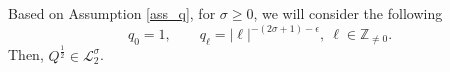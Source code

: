 \documentclass[a4paper]{amsart}
\begin{document}

Based on Assumption \ref{ass_q}, for $\sigma\ge 0$, we will consider the following
$$
q_0=1,\qquad q_{\ell}=|\ell|^{-(2\sigma+1)-\epsilon}, \ \ell\in\mathbb{Z}_{\ne 0}.
$$
Then, $Q^{\frac{1}{2}}\in\mathcal{L}_2^\sigma$. 
\end{document}
